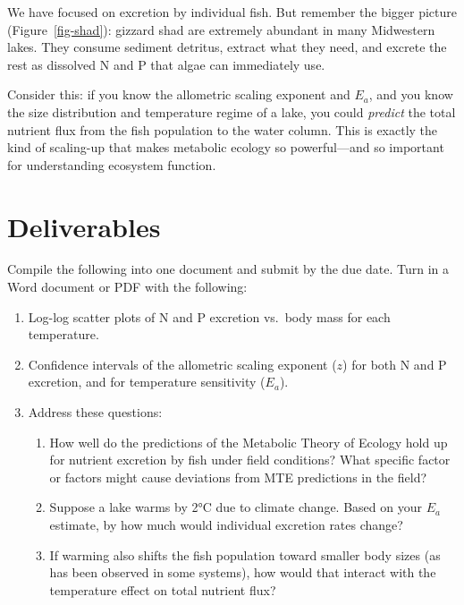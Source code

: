 \documentclass[
  letterpaper,
  DIV=11,
  numbers=noendperiod]{scrreprt}
\providecommand{\tightlist}{%
  \setlength{\itemsep}{0pt}\setlength{\parskip}{0pt}}
\begin{document}
We have focused on excretion by individual fish. But remember the bigger
picture (Figure~\ref{fig-shad}): gizzard shad are extremely abundant in
many Midwestern lakes. They consume sediment detritus, extract what they
need, and excrete the rest as dissolved N and P that algae can
immediately use.

Consider this: if you know the allometric scaling exponent and \(E_a\),
and you know the size distribution and temperature regime of a lake, you
could \emph{predict} the total nutrient flux from the fish population to
the water column. This is exactly the kind of scaling-up that makes
metabolic ecology so powerful---and so important for understanding
ecosystem function.

\section{Deliverables}\label{sec-deliv-metabolic}

Compile the following into one document and submit by the due date. Turn
in a Word document or PDF with the following:

\begin{enumerate}
\def\labelenumi{\arabic{enumi}.}
\tightlist
\item
  Log-log scatter plots of N and P excretion vs.~body mass for each
  temperature.
\item
  Confidence intervals of the allometric scaling exponent (\(z\)) for
  both N and P excretion, and for temperature sensitivity (\(E_a\)).
\item
  Address these questions:

  \begin{enumerate}
  \def\labelenumii{\alph{enumii}.}
  \tightlist
  \item
    How well do the predictions of the Metabolic Theory of Ecology hold
    up for nutrient excretion by fish under field conditions? What
    specific factor or factors might cause deviations from MTE
    predictions in the field?
  \item
    Suppose a lake warms by 2°C due to climate change. Based on your
    \(E_a\) estimate, by how much would individual excretion rates
    change?
  \item
    If warming also shifts the fish population toward smaller body sizes
    (as has been observed in some systems), how would that interact with
    the temperature effect on total nutrient flux?
  \end{enumerate}
\end{enumerate}
\end{document}
